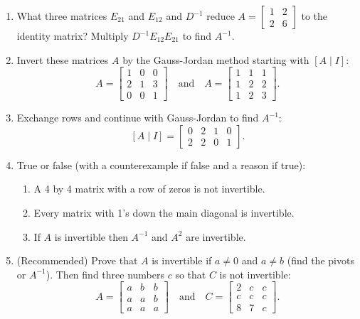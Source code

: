 \documentclass[14pt, a4paper]{article}
\begin{document}
\begin{enumerate}[resume]
    \item What three matrices $E_{21}$ and $E_{12}$ and $D^{-1}$ reduce $A = \begin{bmatrix} 1 & 2 \\ 2 & 6 \end{bmatrix}$ to the identity matrix? Multiply $D^{-1}E_{12}E_{21}$ to find $A^{-1}$.

    \item Invert these matrices $A$ by the Gauss-Jordan method starting with $[A\mid I]$:
          \[
              A = \begin{bmatrix} 1 & 0 & 0 \\ 2 & 1 & 3 \\ 0 & 0 & 1 \end{bmatrix}
              \quad\text{and}\quad
              A = \begin{bmatrix} 1 & 1 & 1 \\ 1 & 2 & 2 \\ 1 & 2 & 3 \end{bmatrix}.
          \]

    \item Exchange rows and continue with Gauss-Jordan to find $A^{-1}$:
          \[
              [A\mid I] = \begin{bmatrix} 0 & 2 & 1 & 0 \\ 2 & 2 & 0 & 1 \end{bmatrix}.
          \]

    \item True or false (with a counterexample if false and a reason if true):
          \begin{enumerate}
              \item A 4 by 4 matrix with a row of zeros is not invertible.
              \item Every matrix with 1's down the main diagonal is invertible.
              \item If $A$ is invertible then $A^{-1}$ and $A^2$ are invertible.
          \end{enumerate}

    \item (Recommended) Prove that $A$ is invertible if $a \ne 0$ and $a \ne b$ (find the pivots or $A^{-1}$). Then find three numbers $c$ so that $C$ is not invertible:
          \[
              A = \begin{bmatrix} a & b & b \\ a & a & b \\ a & a & a \end{bmatrix}
              \quad\text{and}\quad
              C = \begin{bmatrix} 2 & c & c \\ c & c & c \\ 8 & 7 & c \end{bmatrix}.
          \]


\end{enumerate}
\end{document}
